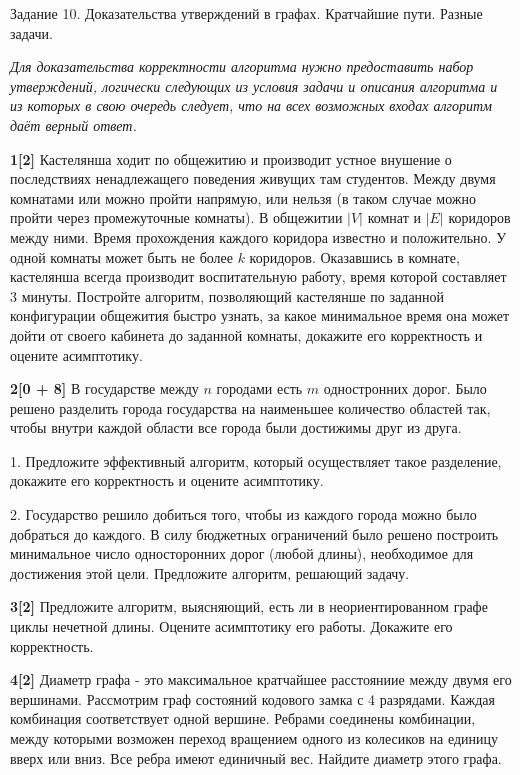 \documentclass{article}
\begin{document}
\begin{center}
\Large {Задание 10. Доказательства утверждений в графах. Кратчайшие пути. Разные задачи.}
\end{center}

\bigskip

\textit{Для доказательства корректности алгоритма нужно предоставить набор утверждений, логически следующих из условия задачи и описания алгоритма и из которых в свою очередь следует, что на всех возможных входах алгоритм даёт верный ответ.}

\medskip

\textbf{1[2]} Кастелянша ходит по общежитию и производит устное внушение о последствиях ненадлежащего поведения живущих там студентов. Между двумя комнатами или можно пройти напрямую, или нельзя (в таком случае можно пройти через промежуточные комнаты). В общежитии $|V|$ комнат и $|E|$ коридоров между ними. Время прохождения каждого коридора известно и положительно. У одной комнаты может быть не более $k$ коридоров. Оказавшись в комнате, кастелянша всегда производит воспитательную работу, время которой составляет 3 минуты. Постройте алгоритм, позволяющий кастелянше по заданной конфигурации общежития быстро узнать, за какое минимальное время она может дойти от своего кабинета до заданной комнаты, докажите его корректность и оцените асимптотику.

\medskip

\textbf{2[0 + 8]} В государстве между $n$ городами есть $m$ одностронних дорог. Было решено разделить города государства на наименьшее количество областей так, чтобы внутри каждой области
все города были достижимы друг из друга.

1. Предложите эффективный алгоритм, который осуществляет такое разделение, докажите его корректность и оцените асимптотику.

2. Государство решило добиться того, чтобы из каждого города можно было добраться до каждого. В силу бюджетных ограничений было решено построить минимальное число односторонних дорог (любой длины), необходимое для достижения этой цели. Предложите алгоритм, решающий задачу.

\medskip

\textbf{3[2]} Предложите алгоритм, выясняющий, есть ли в неориентированном графе циклы нечетной длины. Оцените асимптотику его работы. Докажите его корректность.

\medskip

\textbf{4[2]} Диаметр графа - это максимальное кратчайшее расстояниие между двумя его вершинами. Рассмотрим граф состояний кодового замка с 4 разрядами. Каждая комбинация соответствует одной вершине. Ребрами соединены комбинации, между которыми возможен переход вращением одного из колесиков на единицу вверх или вниз. Все ребра имеют единичный вес. Найдите диаметр этого графа.
\end{document}
